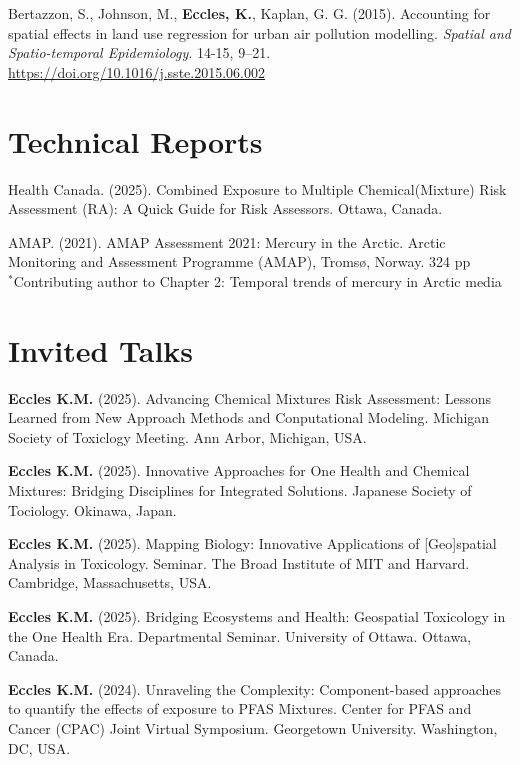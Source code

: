 \documentclass[margin,line]{res}
\begin{document}
\begin{resume}
Bertazzon, S., Johnson, M., \textbf{Eccles, K.}, Kaplan, G. G. (2015). Accounting for spatial effects in land use regression for urban air pollution modelling. \textit{Spatial and Spatio-temporal Epidemiology}. 14-15, 9–21. \url{https://doi.org/10.1016/j.sste.2015.06.002}


\vspace*{.1in}
\section{\sc Technical Reports}
Health Canada. (2025). Combined Exposure to Multiple Chemical(Mixture) Risk Assessment (RA): A Quick Guide for Risk Assessors. Ottawa, Canada.

AMAP. (2021). AMAP Assessment 2021: Mercury in the Arctic. Arctic Monitoring and Assessment Programme (AMAP), Tromsø, Norway. 324 pp\\
$^{*}$Contributing author to Chapter 2: Temporal trends of mercury in Arctic media\\
\vspace*{.1in}

\section{\sc Invited Talks}



\textbf{Eccles K.M.} (2025). Advancing Chemical Mixtures Risk Assessment: Lessons Learned from New Approach Methods and Conputational Modeling. Michigan Society of Toxiclogy Meeting. Ann Arbor, Michigan, USA.

\textbf{Eccles K.M.} (2025). Innovative Approaches for One Health and Chemical Mixtures: Bridging Disciplines for Integrated Solutions. Japanese Society of Tociology. Okinawa, Japan.

\textbf{Eccles K.M.} (2025). Mapping Biology: Innovative Applications of [Geo]spatial Analysis in Toxicology. Seminar. The Broad Institute of MIT and Harvard. Cambridge, Massachusetts, USA.

\textbf{Eccles K.M.} (2025). Bridging Ecosystems and Health: Geospatial Toxicology in the One Health Era. Departmental Seminar. University of Ottawa. Ottawa, Canada.

\textbf{Eccles K.M.} (2024). Unraveling the Complexity: Component-based approaches to quantify the effects of exposure to PFAS Mixtures. Center for PFAS and Cancer (CPAC) Joint Virtual Symposium. Georgetown University. Washington, DC, USA.


\end{resume}
\end{document}

